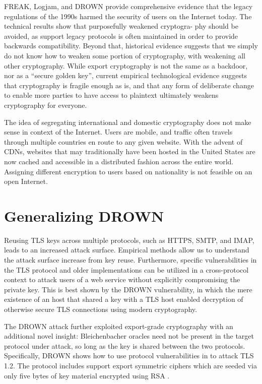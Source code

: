 FREAK, Logjam, and DROWN provide comprehensive evidence that the legacy
regulations of the 1990s harmed the security of users on the Internet today.
The technical results show that purposefully weakened cryptogra- phy should
be avoided, as support legacy protocols is often maintained in order to
provide backwards compatibility. Beyond that, historical evidence suggests
that we simply do not know how to weaken some portion of cryptography, with
weakening all other cryptography. While export cryptography is not the same
as a backdoor, nor as a “secure golden key”, current empirical technological
evidence suggests that cryptography is fragile enough as is, and that any
form of deliberate change to enable more parties to have access to plaintext
ultimately weakens cryptography for everyone.

The idea of segregating international and domestic cryptography does not
make sense in context of the Internet. Users are mobile, and traffic often
travels through multiple countries en route to any given website. With the
advent of CDNs, websites that may traditionally have been hosted in the
United States are now cached and accessible in a distributed fashion across
the entire world. Assigning different encryption to users based on
nationality is not feasible on an open Internet.

\section{Generalizing DROWN}

Reusing TLS keys across multiple protocols, such as HTTPS, SMTP, and IMAP,
leads to an increased attack surface. Empirical methods allow us to understand
the attack surface increase from key reuse. Furthermore, specific
vulnerabilities in the TLS protocol and older implementations can be utilized
in a cross-protocol context to attack users of a web service without explicitly
compromising the private key. This is best shown by the DROWN vulnerability, in
which the mere existence of an \ssltwo host that shared a key with a TLS host
enabled decryption of otherwise secure TLS connections using modern
cryptography.

The DROWN attack further exploited export-grade cryptography with an additional
novel insight: Bleichenbacher oracles need not be present in the target
protocol under attack, so long as the key is shared between the two protocols.
Specifically, DROWN shows how to use protocol vulnerabilities in \ssltwo to
attack TLS 1.2. The \ssltwo protocol includes support export symmetric ciphers
which are seeded via only five bytes of key material encrypted using RSA \PKCS.

